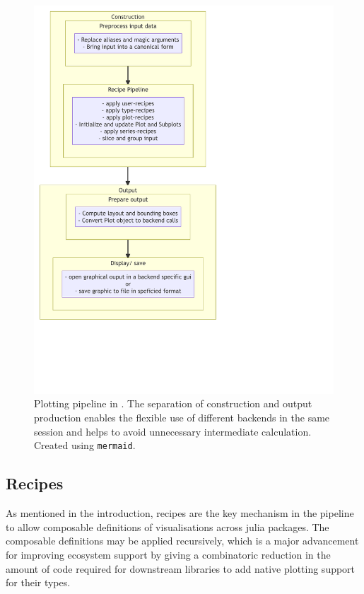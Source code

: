 \documentclass[a4paper]{article}
\begin{document}
\begin{figure}[H]
    \centering
    \includegraphics[width=\textwidth]{./fig/Pipeline.pdf}
    \caption{
        Plotting pipeline in \Plots{}.
        The separation of construction and output production enables the flexible use of different backends in the same session and helps to avoid unnecessary intermediate calculation.
        Created using \texttt{mermaid}\cite{Mermaid}.
    }
    \label{fig:pipeline}
\end{figure}

\subsection*{Recipes}
\label{sec:recipes}

As mentioned in the introduction, recipes are the key mechanism in the \Plots \linebreak pipeline to allow composable definitions of visualisations across julia packages.
The composable definitions may be applied recursively, which is a major advancement for improving ecosystem support by giving a combinatoric reduction in the amount of code required for downstream libraries to add native plotting support for their types.
\end{document}
